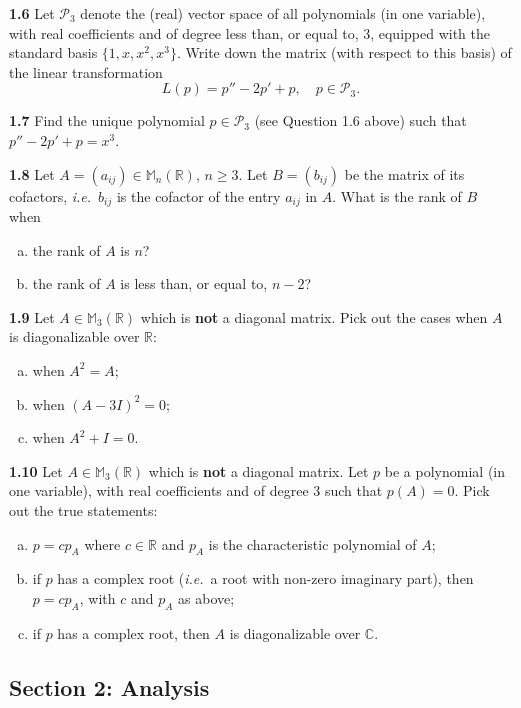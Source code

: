 \documentclass[11pt,a4paper]{article}
\newcommand{\R}{\mathbb{R}}
\newcommand{\C}{\mathbb{C}}
\newcommand{\M}{\mathbb{M}}
\newcommand{\examsec}[1]{%
  \subsection*{#1}
  \vspace{-2pt}
}
\newcommand{\qitem}[1]{\par\medskip\noindent\textbf{#1}\hspace{0.5em}}
\begin{document}
\qitem{1.6} Let $\mathcal{P}_3$ denote the (real) vector space of all polynomials (in one variable), with real coefficients and of degree less than, or equal to, $3$, equipped with the standard basis $\{1, x, x^2, x^3\}$. Write down the matrix (with respect to this basis) of the linear transformation
\[
  L(p) = p'' - 2p' + p,\quad p \in \mathcal{P}_3.
\]

\qitem{1.7} Find the unique polynomial $p \in \mathcal{P}_3$ (see Question 1.6 above) such that $p'' - 2p' + p = x^3$.

\qitem{1.8} Let $A = (a_{ij}) \in \M_n(\R)$, $n \ge 3$. Let $B = (b_{ij})$ be the matrix of its cofactors, \emph{i.e.}\ $b_{ij}$ is the cofactor of the entry $a_{ij}$ in $A$. What is the rank of $B$ when
\begin{enumerate}[a.]
  \item the rank of $A$ is $n$?
  \item the rank of $A$ is less than, or equal to, $n - 2$?
\end{enumerate}

\qitem{1.9} Let $A \in \M_3(\R)$ which is \textbf{not} a diagonal matrix. Pick out the cases when $A$ is diagonalizable over $\R$:
\begin{enumerate}[a.]
  \item when $A^2 = A$;
  \item when $(A - 3I)^2 = 0$;
  \item when $A^2 + I = 0$.
\end{enumerate}

\qitem{1.10} Let $A \in \M_3(\R)$ which is \textbf{not} a diagonal matrix. Let $p$ be a polynomial (in one variable), with real coefficients and of degree $3$ such that $p(A) = 0$. Pick out the true statements:
\begin{enumerate}[a.]
  \item $p = cp_A$ where $c \in \R$ and $p_A$ is the characteristic polynomial of $A$;
  \item if $p$ has a complex root (\emph{i.e.}\ a root with non-zero imaginary part), then $p = cp_A$, with $c$ and $p_A$ as above;
  \item if $p$ has a complex root, then $A$ is diagonalizable over $\C$.
\end{enumerate}

\examsec{Section 2: Analysis}
\end{document}
